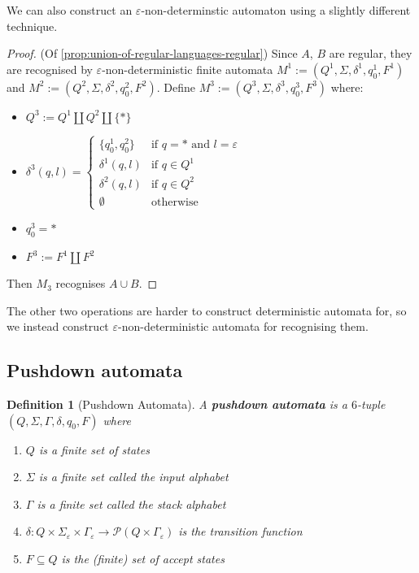 \documentclass{article}
\theoremstyle{break}
\newtheorem{definition}[theorem]{Definition}
\begin{document}
We can also construct an $\varepsilon$-non-determinstic automaton using a slightly different technique.

\begin{proof}(Of \ref{prop:union-of-regular-languages-regular})
\label{prf:union-of-regular-languages-regular-ep}
Since $A$, $B$ are regular, they are recognised by $\varepsilon$-non-deterministic finite automata $M^1:=(Q^1,\Sigma,\delta^1,q^1_0,F^1)$ and $M^2:=(Q^2,\Sigma,\delta^2,q^2_0,F^2)$.
Define $M^3:=(Q^3,\Sigma,\delta^3,q^3_0,F^3)$ where:
\begin{itemize}
  \item $Q^3 := Q^1 \coprod Q^2 \coprod \{\ast\}$
  \item $\delta^3(q,l) = \begin{cases}
  \{q^1_0, q^2_0\} & \text{if } q=\ast \text{ and } l = \varepsilon \\
  \delta^1(q,l) & \text{if } q\in Q^1 \\
  \delta^2(q,l) & \text{if } q\in Q^2 \\
  \emptyset & \text{otherwise} 
\end{cases}$
  \item $q^3_0 = \ast$
  \item $F^3 := F^1 \coprod F^2$
\end{itemize}
Then $M_3$ recognises $A\cup B$.
\end{proof}

The other two operations are harder to construct deterministic automata for, so we instead construct $\varepsilon$-non-deterministic automata for recognising them.


\begin{comment}
  Some constructions should go here
  Then we should do the Regex <-> Automaton equivalence
\end{comment}

\subsection{Pushdown automata}

\begin{definition}[Pushdown Automata]
\label{def:pushdown}
  A \textbf{pushdown automata} is a $6$-tuple $(Q,\Sigma, \Gamma, \delta, q_0, F)$ where 
  \begin{enumerate}
      \item $Q$ is a finite set of \textit{states}
      \item $\Sigma$ is a finite set called the \textit{input alphabet}
      \item $\Gamma$ is a finite set called the \textit{stack alphabet}
      \item $\delta: Q\times \Sigma_{\varepsilon} \times \Gamma_{\varepsilon} \to \mathcal{P}(Q\times \Gamma_{\varepsilon})$ is the \textit{transition function}
      \item $F \subseteq Q$ is the (finite) set of \textit{accept states}
  \end{enumerate}
\end{definition}
\end{document}
